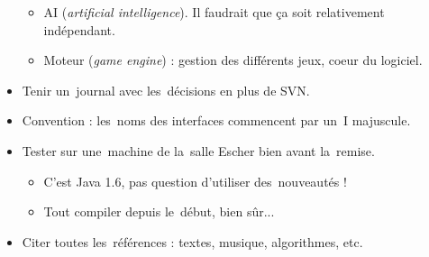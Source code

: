 \begin{itemize}
\begin{itemize}
            \item AI (\textit{artificial intelligence}). Il faudrait que ça soit relativement indépendant.
            \item Moteur (\textit{game engine}) : gestion des différents jeux, coeur du logiciel.
        \end{itemize}
    \item Tenir un~journal avec les~décisions en plus de SVN.
    \item Convention : les~noms des interfaces commencent par un~I majuscule.
    \item Tester sur une~machine de la~salle Escher bien avant la~remise.
        \begin{itemize}
            \item C'est Java 1.6, pas question d'utiliser des~nouveautés !
            \item Tout compiler depuis le~début, bien sûr...
        \end{itemize}
    \item Citer toutes les~références : textes, musique, algorithmes, etc.
\end{itemize}
